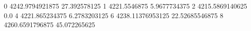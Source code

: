 0 4242.9794921875 27.392578125
1 4221.5546875 5.9677734375
2 4215.5869140625 0.0
4 4221.865234375 6.2783203125
6 4238.11376953125 22.52685546875
8 4260.6591796875 45.072265625
